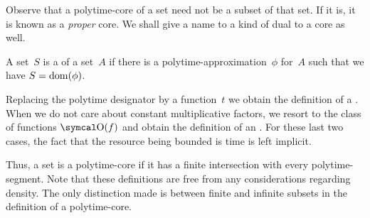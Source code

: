 Observe that a polytime-core of a set need not be a subset of that set.
If it is, it is known as a \emph{proper} core.
We shall give a name to a kind of dual to a core as well.
\begin{definition}
  A set~$S$ is a  of a set~$A$ if there is a polytime-approximation~$\phi$ for~$A$ such that we have $S = \operatorname{dom}(\phi)$.

  Replacing the polytime designator by a function~$t$ we obtain the definition of a .
  When we do not care about constant multiplicative factors, we resort to the class of functions $\bigO(f)$ and obtain the definition of an .
  For these last two cases, the fact that the resource being bounded is time is left implicit.
\end{definition}
Thus, a set is a polytime-core if it has a finite intersection with every polytime-segment.
Note that these definitions are free from any considerations regarding density.
The only distinction made is between finite and infinite subsets in the definition of a polytime-core.

